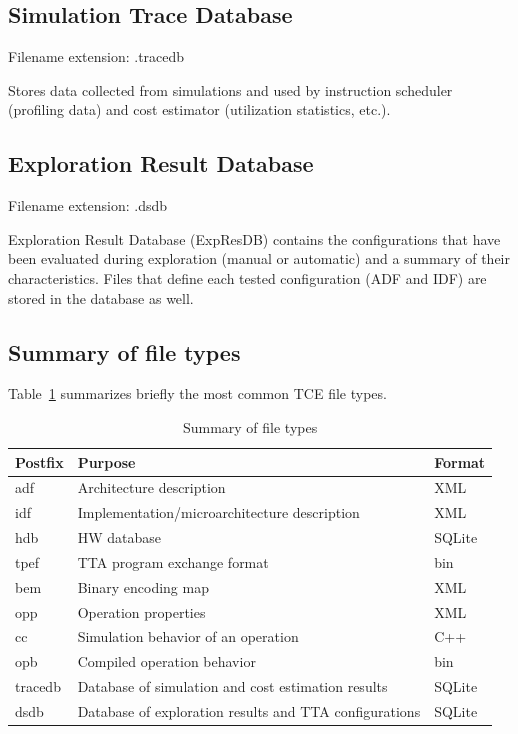 \documentclass[twoside]{tceusermanual}
\begin{document}
\subsection{Simulation Trace Database}
\label{sec:tracedb}

Filename extension: .tracedb

Stores data collected from simulations and used by instruction scheduler
(profiling data) and cost estimator (utilization statistics, etc.).

\subsection{Exploration Result Database}
\label{sec:expresdb}

Filename extension: .dsdb

Exploration Result Database (ExpResDB) contains the configurations that have
been evaluated during exploration (manual or automatic) and a summary of
their characteristics. Files that define each tested configuration (ADF and
IDF) are stored in the database as well. 



\subsection{Summary of file types}
\label{sec:summary}

Table~\ref{tab:files} summarizes briefly the most common TCE file types.

\begin{table}[b]
  \begin{center}
    \caption {Summary of file types}
    \label {tab:files}
    \begin{tabular}{l | l | l }
      \hline
      Postfix  & Purpose                                    & Format \\
      \hline
      \hline
      adf      & Architecture description                 & XML \\
      idf      & Implementation/microarchitecture description & XML \\
      hdb      & HW database                                & SQLite \\
      \hline
      tpef     & TTA program exchange format                & bin \\
      bem      & Binary encoding map                        & XML \\
      opp      & Operation properties                       & XML \\
      cc       & Simulation behavior of an operation                   & C++\\
      opb      & Compiled operation behavior                & bin \\
      \hline
      tracedb  & Database of simulation and cost estimation results     & SQLite \\
      dsdb     & Database of exploration results and TTA configurations & SQLite \\
      \hline
    \end{tabular}
  \end{center}
\end{table}
\end{document}
